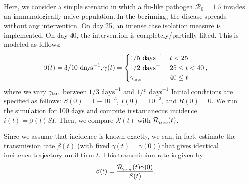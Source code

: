 \documentclass[12pt]{article}
\newcommand{\Rx}[1]{\ensuremath{{\mathcal R}_{#1}}\xspace}
\newcommand{\Ro}{\Rx{0}}
\newcommand{\RR}{\ensuremath{{\mathcal R}}\xspace}
\newcommand{\tsub}[2]{#1_{{\textrm{\tiny #2}}}}
\begin{document}
Here, we consider a simple scenario in which a flu-like pathogen $\Ro = 1.5$ invades an immunologically naive population.
In the beginning, the disease spreads without any intervention.
On day 25, an intense case isolation measure is implemented. 
On day 40, the intervention is completely/partially lifted.
This is modeled as follows:
\begin{equation}
\beta(t) = 3/10\,\,\textrm{days}^{-1}, \gamma(t) = \begin{cases}
1/5\,\, \textrm{days}^{-1} & t < 25\\
1/2\,\, \textrm{days}^{-1} & 25 \leq t < 40 \\
\tsub{\gamma}{late} & 40 \leq t
\end{cases},
\end{equation}
where we vary $\tsub{\gamma}{late}$ between $1/3\,\, \textrm{days}^{-1}$ and $1/5\,\, \textrm{days}^{-1}$
Initial conditions are specified as follows: $S(0) = 1 - 10^{-3}$, $I(0) = 10^{-3}$, and $R(0) = 0$.
We run the simulation for 100 days and compute instantaneous incidence $i(t) = \beta(t) S I$. 
Then, we compare $\RR(t)$ with $\tsub{\RR}{prop}(t)$.

Since we assume that incidence is known exactly, we can, in fact, estimate the transmission rate $\beta(t)$ (with fixed $\gamma(t)=\gamma(0)$) that gives identical incidence trajectory until time $t$.
This transmission rate is given by:
\begin{equation}
\beta(t) = \frac{\tsub{\RR}{prop}(t)\gamma(0)}{S(t)}.
\end{equation}
\end{document}
